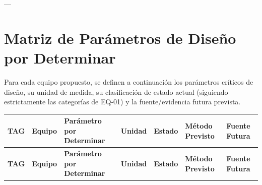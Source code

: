 \documentclass[11pt,letterpaper]{article}
\begin{document}
---

\section{Matriz de Parámetros de Diseño por Determinar}

Para cada equipo propuesto, se definen a continuación los parámetros críticos de diseño, su unidad de medida, su clasificación de estado actual (siguiendo estrictamente las categorías de EQ-01) y la fuente/evidencia futura prevista.

\begin{small}
\begin{longtable}{|p{1.2cm}|p{2.2cm}|p{3.2cm}|p{1.2cm}|p{2.4cm}|p{2.6cm}|p{2.4cm}|}
    \hline
    \rowcolor{SolvantaNavy}
    \textbf{\color{white}TAG} & \textbf{\color{white}Equipo} & \textbf{\color{white}Parámetro por Determinar} & \textbf{\color{white}Unidad} & \textbf{\color{white}Estado} & \textbf{\color{white}Método Previsto} & \textbf{\color{white}Fuente Futura} \\
    \hline
    \endfirsthead
    \hline
    \rowcolor{SolvantaNavy}
    \textbf{\color{white}TAG} & \textbf{\color{white}Equipo} & \textbf{\color{white}Parámetro por Determinar} & \textbf{\color{white}Unidad} & \textbf{\color{white}Estado} & \textbf{\color{white}Método Previsto} & \textbf{\color{white}Fuente Futura} \\
    \hline
    \endhead


\end{longtable}
\end{small}
\end{document}
